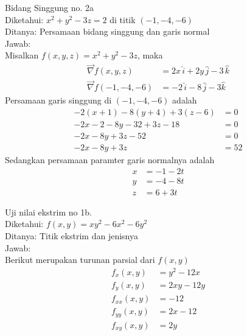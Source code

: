 \documentclass{article}
\begin{document}
    Bidang Singgung no. 2a \\
    Diketahui: \(x^2 + y^2 -3z = 2\) di titik \((-1, -4, -6)\) \\
    Ditanya: Persamaan bidang singgung dan garis normal \\
    Jawab: \\
    Misalkan \(f(x, y, z) = x^2 + y^2 -3z\), maka
    \begin{displaymath}
        \begin{split}
            \vec{\nabla}f(x, y, z) & = 2x \, \hat i + 2y \, \hat j - 3 \, \hat k \\
            \vec{\nabla}f(-1, -4, -6) & = -2 \, \hat i - 8 \, \hat j - 3 \hat k
        \end{split}
    \end{displaymath}
    Persamaan garis singgung di \((-1, -4, -6)\) adalah
    \begin {displaymath}
        \begin{split}
            -2 (x + 1) - 8 (y + 4) + 3 (z - 6) & = 0 \\
            -2x - 2 - 8y - 32 + 3z - 18 & = 0 \\
            -2x - 8y + 3z - 52 & = 0 \\
            -2x - 8y + 3z & = 52
        \end{split}
    \end {displaymath}
    Sedangkan persamaan paramter garis normalnya adalah
    \begin{displaymath}
        \begin{split}
            x & = -1 - 2t \\
            y & = -4 - 8t \\
            z & = 6 + 3t
        \end{split}
    \end{displaymath}

    Uji nilai ekstrim no 1b. \\
    Diketahui: \(f(x, y) = xy^2 - 6x^2 - 6y^2\) \\
    Ditanya: Titik ekstrim dan jenisnya \\
    Jawab: \\
    Berikut merupakan turunan parsial dari \(f(x, y)\)
    \begin{displaymath}
        \begin{split}
            f_x(x, y) & = y^2 - 12x \\
            f_y(x, y) & = 2xy - 12y \\
            f_{xx}(x, y) & = -12 \\
            f_{yy}(x, y) & = 2x - 12 \\
            f_{xy}(x, y) & =  2y
        \end{split}
    \end{displaymath}
\end{document}
